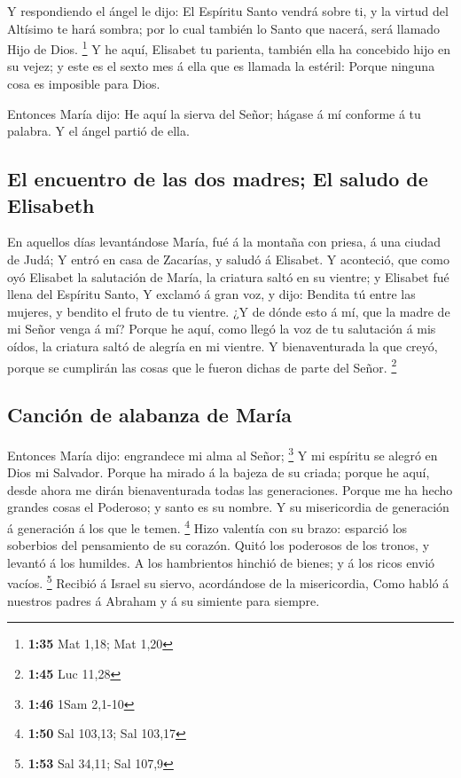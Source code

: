  Y respondiendo el ángel le dijo: El Espíritu Santo vendrá
sobre ti, y la virtud del Altísimo te hará sombra; por lo cual también
lo Santo que nacerá, será llamado Hijo de Dios. \footnote{\textbf{1:35}
  Mat 1,18; Mat 1,20}  Y he aquí, Elisabet tu parienta,
también ella ha concebido hijo en su vejez; y este es el sexto mes á
ella que es llamada la estéril:  Porque ninguna cosa es
imposible para Dios.

 Entonces María dijo: He aquí la sierva del Señor; hágase á
mí conforme á tu palabra. Y el ángel partió de ella.

\hypertarget{el-encuentro-de-las-dos-madres-el-saludo-de-elisabeth}{%
\subsection{El encuentro de las dos madres; El saludo de
Elisabeth}\label{el-encuentro-de-las-dos-madres-el-saludo-de-elisabeth}}

 En aquellos días levantándose María, fué á la montaña con
priesa, á una ciudad de Judá;  Y entró en casa de Zacarías,
y saludó á Elisabet.  Y aconteció, que como oyó Elisabet la
salutación de María, la criatura saltó en su vientre; y Elisabet fué
llena del Espíritu Santo,  Y exclamó á gran voz, y dijo:
Bendita tú entre las mujeres, y bendito el fruto de tu vientre.
 ¿Y de dónde esto á mí, que la madre de mi Señor venga á
mí?  Porque he aquí, como llegó la voz de tu salutación á
mis oídos, la criatura saltó de alegría en mi vientre.  Y
bienaventurada la que creyó, porque se cumplirán las cosas que le fueron
dichas de parte del Señor. \footnote{\textbf{1:45} Luc 11,28}

\hypertarget{canciuxf3n-de-alabanza-de-maruxeda}{%
\subsection{Canción de alabanza de
María}\label{canciuxf3n-de-alabanza-de-maruxeda}}

 Entonces María dijo: engrandece mi alma al Señor;
\footnote{\textbf{1:46} 1Sam 2,1-10}  Y mi espíritu se
alegró en Dios mi Salvador.  Porque ha mirado á la bajeza
de su criada; porque he aquí, desde ahora me dirán bienaventurada todas
las generaciones.  Porque me ha hecho grandes cosas el
Poderoso; y santo es su nombre.  Y su misericordia de
generación á generación á los que le temen. \footnote{\textbf{1:50} Sal
  103,13; Sal 103,17}  Hizo valentía con su brazo: esparció
los soberbios del pensamiento de su corazón.  Quitó los
poderosos de los tronos, y levantó á los humildes.  A los
hambrientos hinchió de bienes; y á los ricos envió vacíos. \footnote{\textbf{1:53}
  Sal 34,11; Sal 107,9}  Recibió á Israel su siervo,
acordándose de la misericordia,  Como habló á nuestros
padres á Abraham y á su simiente para siempre.

